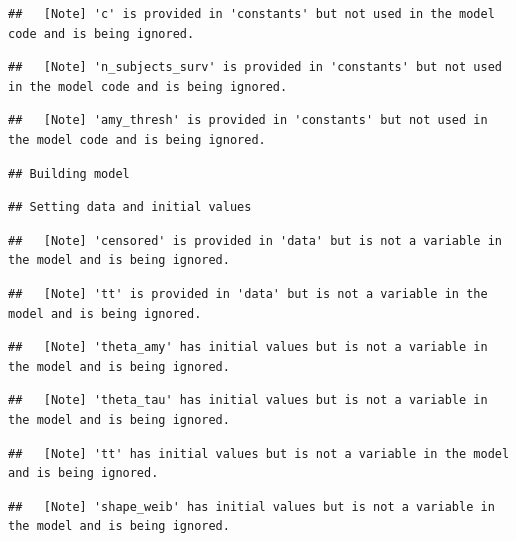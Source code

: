 \documentclass[
]{article}
\begin{document}
\begin{verbatim}
##   [Note] 'c' is provided in 'constants' but not used in the model code and is being ignored.
\end{verbatim}

\begin{verbatim}
##   [Note] 'n_subjects_surv' is provided in 'constants' but not used in the model code and is being ignored.
\end{verbatim}

\begin{verbatim}
##   [Note] 'amy_thresh' is provided in 'constants' but not used in the model code and is being ignored.
\end{verbatim}

\begin{verbatim}
## Building model
\end{verbatim}

\begin{verbatim}
## Setting data and initial values
\end{verbatim}

\begin{verbatim}
##   [Note] 'censored' is provided in 'data' but is not a variable in the model and is being ignored.
\end{verbatim}

\begin{verbatim}
##   [Note] 'tt' is provided in 'data' but is not a variable in the model and is being ignored.
\end{verbatim}

\begin{verbatim}
##   [Note] 'theta_amy' has initial values but is not a variable in the model and is being ignored.
\end{verbatim}

\begin{verbatim}
##   [Note] 'theta_tau' has initial values but is not a variable in the model and is being ignored.
\end{verbatim}

\begin{verbatim}
##   [Note] 'tt' has initial values but is not a variable in the model and is being ignored.
\end{verbatim}

\begin{verbatim}
##   [Note] 'shape_weib' has initial values but is not a variable in the model and is being ignored.
\end{verbatim}
\end{document}
